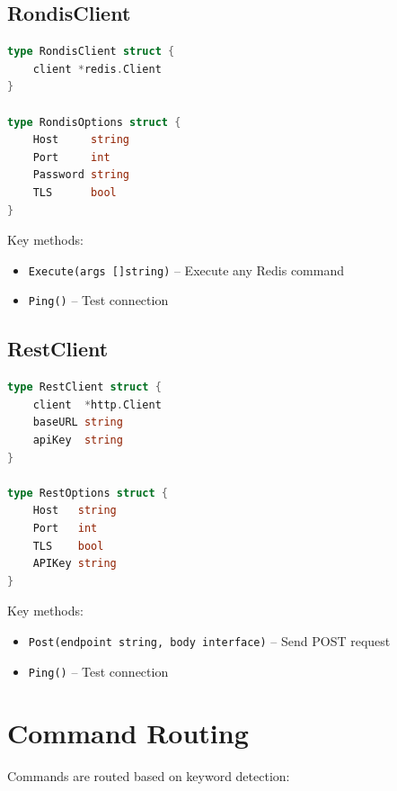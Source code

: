 \documentclass[11pt,a4paper]{report}
\begin{document}
\subsection{RondisClient}

\begin{lstlisting}[language=Go]
type RondisClient struct {
    client *redis.Client
}

type RondisOptions struct {
    Host     string
    Port     int
    Password string
    TLS      bool
}
\end{lstlisting}

Key methods:
\begin{itemize}
    \item \texttt{Execute(args []string)} -- Execute any Redis command
    \item \texttt{Ping()} -- Test connection
\end{itemize}

\subsection{RestClient}

\begin{lstlisting}[language=Go]
type RestClient struct {
    client  *http.Client
    baseURL string
    apiKey  string
}

type RestOptions struct {
    Host   string
    Port   int
    TLS    bool
    APIKey string
}
\end{lstlisting}

Key methods:
\begin{itemize}
    \item \texttt{Post(endpoint string, body interface{})} -- Send POST request
    \item \texttt{Ping()} -- Test connection
\end{itemize}

\section{Command Routing}

Commands are routed based on keyword detection:
\end{document}
